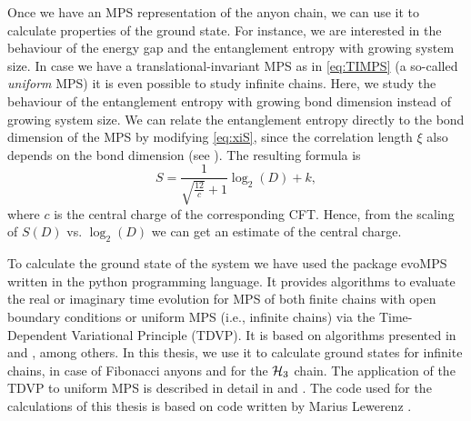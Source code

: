 Once we have an MPS representation of the anyon chain, we can use it to calculate properties of the ground state. For instance, we are interested in the behaviour of the energy gap and the entanglement entropy with growing system size. In case we have a translational-invariant MPS as in \cref{eq:TIMPS} (a so-called \emph{uniform} MPS) it is even possible to study infinite chains. Here, we study the behaviour of the entanglement entropy with growing bond dimension instead of growing system size. We can relate the entanglement entropy directly to the bond dimension of the MPS by modifying \cref{eq:xiS}, since the correlation length $\xi$ also depends on the bond dimension (see \cite{Stojevic2015}). The resulting formula is 
	\begin{equation}
	\label{eq:SD}
		S=\frac{1}{\sqrt{\frac{12}{c}}+1}\log_2(D)+k,
	\end{equation}
where $c$ is the central charge of the corresponding CFT. Hence, from the scaling of $S(D)$ vs. $\log_2(D)$ we can get an estimate of the central charge.

To calculate the ground state of the system we have used the package evoMPS \cite{evoMPS} written in the python programming language. It provides algorithms to evaluate the real or imaginary time evolution for MPS of both finite chains with open boundary conditions or uniform MPS (i.e., infinite chains) via the Time-Dependent Variational Principle (TDVP). It is based on algorithms presented in \cite{Haegeman2011} and \cite{Milsted2013}, among others. In this thesis, we use it to calculate ground states for infinite chains, in case of Fibonacci anyons and for the ${\mathcal{H}_3}$ chain. The application of the TDVP to uniform MPS is described in detail in \cite{Haegeman2011} and \cite{Haegeman2013}. The code used for the calculations of this thesis is based on code written by Marius Lewerenz \cite{PrivateMarius}.

